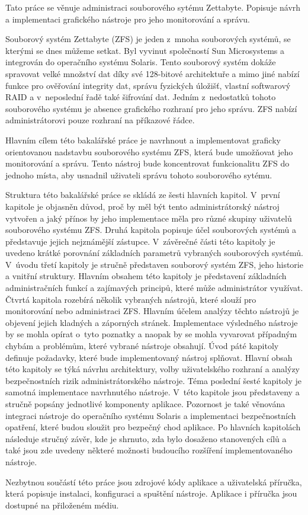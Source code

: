 Tato práce se věnuje administraci souborového sytému Zettabyte. Popisuje návrh a implementaci grafického nástroje pro jeho monitorování a správu.

Souborový systém Zettabyte (ZFS) je jeden z~mnoha souborových systémů, se kterými se dnes můžeme setkat.
Byl vyvinut společností Sun Microsystems a integrován do operačního systému Solaris. Tento souborový systém dokáže spravovat velké množství dat díky své 128-bitové architektuře a mimo jiné nabízí funkce pro ověřování integrity dat, správu fyzických úložišť, vlastní softwarový RAID a v~neposlední
řadě také šifrování dat. Jedním z~nedostatků tohoto souborového systému je absence grafického rozhraní pro jeho správu. ZFS nabízí administrátorovi pouze rozhraní na příkazové řádce.

Hlavním cílem této bakalářské práce je navrhnout a implementovat graficky orientovanou nadstavbu souborového systému ZFS, která bude umožňovat jeho monitorování a správu. Tento nástroj bude koncentrovat funkcionalitu ZFS do jednoho místa, aby usnadnil uživateli správu tohoto souborového sytému.

Struktura této bakalářské práce se skládá ze šesti hlavních kapitol.
V~první kapitole je objasněn důvod, proč by měl být tento administrátorský nástroj vytvořen a jaký přínos by jeho implementace měla pro různé skupiny uživatelů souborového systému ZFS.
Druhá kapitola popisuje účel souborových systémů a představuje jejich nejznámější zástupce. V~závěrečné části této kapitoly je uvedeno krátké porovnání základních parametrů vybraných souborových systémů.
V~úvodu třetí kapitoly je stručně představen souborový systém ZFS, jeho historie a vnitřní struktury. Hlavním obsahem této kapitoly je představení základních administračních funkcí a zajímavých principů, které může administrátor využívat.
Čtvrtá kapitola rozebírá několik vybraných nástrojů, které slouží pro monitorování nebo administraci ZFS. Hlavním účelem analýzy těchto nástrojů je objevení jejich kladných a záporných stránek. Implementace výsledného nástroje by se mohla opírat o~tyto poznatky a naopak by se mohla vyvarovat případným chybám a problémům, které vybrané nástroje obsahují.
Úvod páté kapitoly definuje požadavky, které bude implementovaný nástroj splňovat. Hlavní obsah této kapitoly se týká návrhu architektury, volby uživatelského rozhraní a analýzy bezpečnostních rizik administrátorského nástroje.
Téma poslední šesté kapitoly je samotná implementace navrhnutého nástroje. V~této kapitole jsou představeny a stručně popsány jednotlivé komponenty aplikace. Pozornost je také věnována integraci nástroje do operačního systému Solaris a implementaci bezpečnostních opatření, které budou sloužit pro bezpečný chod aplikace.
Po hlavních kapitolách následuje stručný závěr, kde je shrnuto, zda bylo dosaženo stanovených cílů a také jsou zde uvedeny některé možnosti budoucího rozšíření implementovaného nástroje.

Nezbytnou součástí této práce jsou zdrojové kódy aplikace a uživatelská příručka, která popisuje instalaci, konfiguraci a spuštění nástroje. Aplikace i příručka jsou dostupné na přiloženém médiu.



